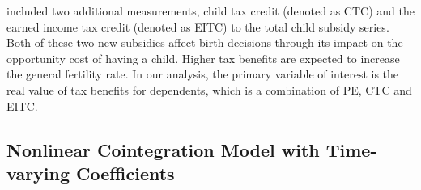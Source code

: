 \documentclass[12pt,a4paper]{article}
\begin{document}
	
	included two additional measurements, child tax credit (denoted as CTC) and the earned income tax credit (denoted as EITC) to the total child subsidy series. Both of these two new subsidies affect birth decisions through its impact on the opportunity cost of having a child. Higher tax benefits are expected to increase the general fertility rate. In our analysis, the primary variable of interest is the real value of tax benefits for dependents, which is a combination of PE, CTC and EITC.
	
\subsection{Nonlinear Cointegration Model with Time-varying Coefficients}
%	
%	
\end{document}
